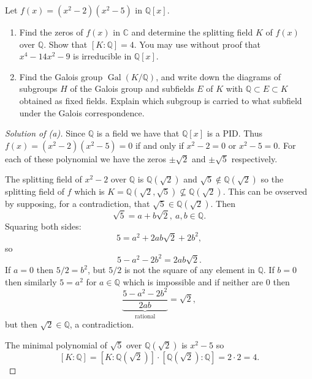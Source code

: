 \begin{prob}[4, Exam 2021]
    Let $f(x) = (x^2 - 2)(x^2 - 5)$ in $\mathbb Q[x]$. 

    \begin{enumerate}[label=\alph*)]
        \item Find the zeros of 
            $f(x)$ in $\mathbb C$ and determine 
            the splitting field $K$ of $f(x)$ over 
            $\mathbb Q$. Show that $[K : \mathbb Q] = 4$.  
            You may use without proof that 
            $x^4 - 14x^2 - 9$ is irreducible in $\mathbb Q[x]$.
        \item Find the Galois group $\operatorname{Gal}(K/\mathbb Q)$,
            and write down the diagrams of subgroups $H$ of 
            the Galois group and subfields $E$ of $K$ with 
            $\mathbb Q \subset E \subset K$ obtained 
            as fixed fields. Explain which subgroup is carried to 
            what subfield under the Galois correspondence. 
            
    \end{enumerate}
\end{prob}
\begin{proof}[Solution of (a)]
    Since $\mathbb Q$ is a field we have that 
    $\mathbb Q[x]$ is a PID. Thus 
    $f(x) = (x^2 - 2)(x^2 - 5) = 0$ if and only if 
    $x^2 - 2 = 0$ or $x^2 - 5 = 0$. For each of these 
    polynomial we have the zeros $\pm \sqrt 2$ and 
    $\pm \sqrt 5$ respectively. 

    The splitting field of $x^2 - 2$ over $\mathbb Q$ 
    is $\mathbb Q(\sqrt 2)$ and 
    $\sqrt 5 \not\in \mathbb Q(\sqrt 2)$ so 
    the splitting field of $f$ which is 
    $K=\mathbb Q(\sqrt 2, \sqrt 5) \not\subseteq \mathbb Q(\sqrt 2)$. 
    This can be ovserved by supposing, for a contradiction, 
    that $\sqrt 5 \in \mathbb Q(\sqrt 2)$. Then 
    \[
        \sqrt 5 = a+b\sqrt 2, \ a,b \in \mathbb Q. 
    \]
    Squaring both sides: 
    \[
        5 = a^2 + 2ab\sqrt 2 + 2b^2, 
    \]
    so 
    \[
        5 - a^2 - 2b^2 = 2ab\sqrt 2. 
    \]
    If $a = 0$ then $5/2 = b^2$, but $5/2$ is not the square 
    of any element in $\mathbb Q$. If $b = 0$ then similarly 
    $5 = a^2$ for $a \in \mathbb Q$ which is impossible and 
    if neither are $0$ then 
    \[
        \underbrace{\frac{5-a^2 - 2b^2}{2ab}}_{\text{rational}}
        =\sqrt 2, 
    \]
    but then $\sqrt 2 \in \mathbb Q$, a contradiction.

    The minimal polynomial of $\sqrt 5$ over 
    $\mathbb Q(\sqrt 2)$ is $x^2 - 5$ so 
    \[
        [K : \mathbb Q] = [K : \mathbb Q(\sqrt 2)] 
        \cdot [\mathbb Q(\sqrt 2) : \mathbb Q]
        = 2 \cdot 2 = 4. 
    \]
\end{proof}
